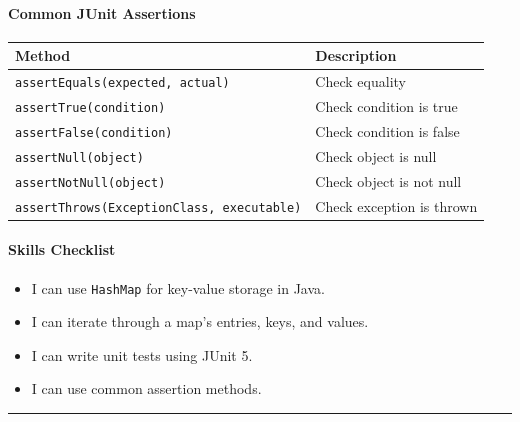 \documentclass[
  justified,
  openright,
]{tufte-book}
\let\subsubsection\paragraph
\let\paragraph\paragraph
\let\subsubsection\paragraph
\let\paragraph\paragraph
\providecommand{\tightlist}{%
  \setlength{\itemsep}{0pt}\setlength{\parskip}{0pt}}
\begin{document}
\subsubsection{Common JUnit Assertions}\label{common-junit-assertions}

{\def\LTcaptype{none} %
\begin{longtable}[]{@{}
  >{\raggedright\arraybackslash}p{}
  >{\raggedright\arraybackslash}p{}@{}}
\toprule\noalign{}
\begin{minipage}[b]{\linewidth}\raggedright
Method
\end{minipage} & \begin{minipage}[b]{\linewidth}\raggedright
Description
\end{minipage} \\
\midrule\noalign{}
\endhead
\bottomrule\noalign{}
\endlastfoot
\texttt{assertEquals(expected,\ actual)} & Check equality \\
\texttt{assertTrue(condition)} & Check condition is true \\
\texttt{assertFalse(condition)} & Check condition is false \\
\texttt{assertNull(object)} & Check object is null \\
\texttt{assertNotNull(object)} & Check object is not null \\
\texttt{assertThrows(ExceptionClass,\ executable)} & Check exception is
thrown \\
\end{longtable}
}

\subsubsection{Skills Checklist}\label{skills-checklist-18}

\begin{itemize}
\tightlist
\item[$\square$]
  I can use \texttt{HashMap} for key-value storage in Java.
\item[$\square$]
  I can iterate through a map's entries, keys, and values.
\item[$\square$]
  I can write unit tests using JUnit 5.
\item[$\square$]
  I can use common assertion methods.
\end{itemize}

\begin{center}\rule{0.5\linewidth}{0.5pt}\end{center}
\end{document}
